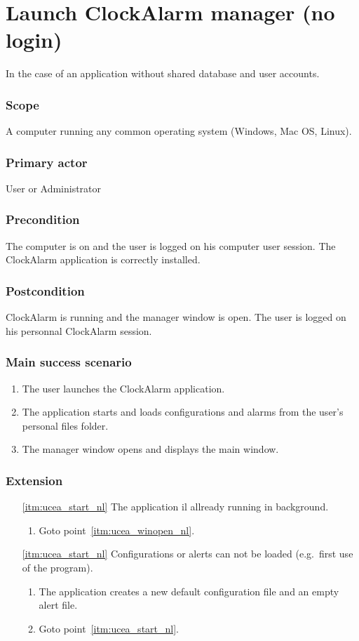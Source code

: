 \section {Launch ClockAlarm manager (no login)}\label{subsec:usecase_launch}
In the case of an application without shared database and user accounts.
\subsubsection{Scope}
A computer running any common operating system (Windows, Mac OS, Linux).
\subsubsection{Primary actor}
User or Administrator
\subsubsection{Precondition}
The computer is on and the user is logged on his computer user session. The ClockAlarm application is correctly installed.
\subsubsection{Postcondition}
ClockAlarm is running and the manager window is open. The user is logged on his personnal ClockAlarm session.
\subsubsection{Main success scenario}
\begin{enumerate}
	\item The user launches the ClockAlarm application.
	\item\label{itm:ucea_start_nl} The application starts and loads configurations and alarms from the user's personal files folder.
	\item\label{itm:ucea_winopen_nl} The manager window opens and displays the main window.
\end{enumerate}
\subsubsection{Extension}
\begin{enumerate}
	\item[\ref{itm:ucea_start_nl}] The application il allready running in background.
	\begin{enumerate}[i]
		\item Goto point~\ref{itm:ucea_winopen_nl}.
	\end{enumerate}
	
	\item[\ref{itm:ucea_start_nl}] Configurations or alerts can not be loaded (e.g.\ first use of the program).
	\begin{enumerate}[i]
		\item The application creates a new default configuration file and an empty alert file.
		\item Goto point~\ref{itm:ucea_start_nl}.
	\end{enumerate}
\end{enumerate}

